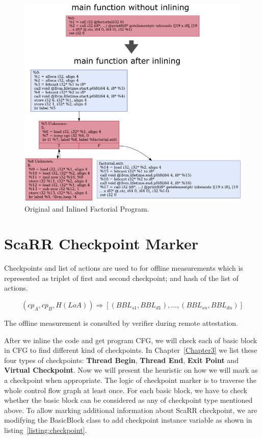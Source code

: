 \begin{figure}[h]
    \centerline{\includegraphics[scale=.80]{Figures/04/inlining-function.png}}
    \caption{Original and Inlined Factorial Program.}
    \label{fig:inlining}
\end{figure}

\section{ScaRR Checkpoint Marker} 
\label{sec:scarr-checkpoint-marker}

Checkpoints and list of actions are used to for offline measurements which is
represented as triplet of first and second checkpoint; and hash of the list of
actions.

$$(cp_A, cp_B, H(LoA)) \Rightarrow [(BBL_{s1}, BBL_{d1}), ..., (BBL_{sn},
BBL_{dn})]$$

The offline measurement is consulted by verifier during remote attestation.

After we inline the code and get program CFG, we will check each of basic block
in CFG to find different kind of checkpoints. In Chapter~\ref{Chapter3} we list
these four types of checkpoints: \textbf{Thread Begin}, \textbf{Thread End},
\textbf{Exit Point} and \textbf{Virtual Checkpoint}. Now we will present the
heuristic on how we will mark as a checkpoint when appropriate.  The logic of
checkpoint marker is to traverse the whole control flow graph at least once. For
each basic block, we have to check whether the basic block can be considered as
any of checkpoint type mentioned above. To allow marking additional information
about ScaRR checkpoint, we are modifying the BasicBlock class to add checkpoint
instance variable as shown in listing~\ref{listing:checkpoint}.

